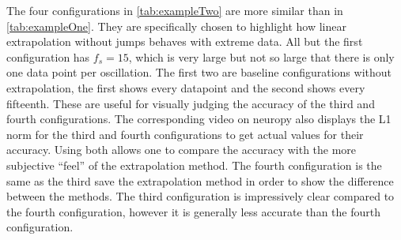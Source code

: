 The four configurations in \cref{tab:exampleTwo} are more similar than in \cref{tab:exampleOne}.
They are specifically chosen to highlight how linear extrapolation without jumps behaves with extreme data.
All but the first configuration has $f_s=15$, which is very large but not so large that there is only one data point per oscillation.
The first two are baseline configurations without extrapolation, the first shows every datapoint and the second shows every fifteenth.
These are useful for visually judging the accuracy of the third and fourth configurations.
The corresponding video on neuropy also displays the L1 norm for the third and fourth configurations to get actual values for their accuracy.
Using both allows one to compare the accuracy with the more subjective ``feel'' of the extrapolation method.
The fourth configuration is the same as the third save the extrapolation method in order to show the difference between the methods.
The third configuration is impressively clear compared to the fourth configuration, however it is generally less accurate than the fourth configuration.


